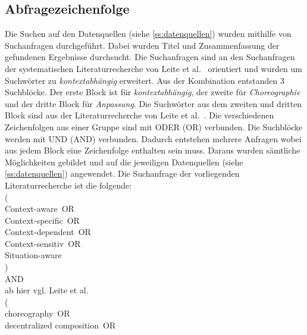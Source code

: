 \documentclass[conference,compsoc,ngerman]{IEEEtran}
\begin{document}
\subsection{Abfragezeichenfolge}
\label{section:suchanfrage}
Die Suchen auf den Datenquellen (siehe \cref{ss:datenquellen}) wurden mithilfe von Suchanfragen durchgeführt. Dabei wurden Titel und Zusammenfassung der gefundenen Ergebnisse durchsucht.
Die Suchanfragen sind an den Suchanfragen der systematischen Literaturrecherche von Leite et al.~\cite{leite2013systematic} orientiert und wurden um Suchwörter zu \textit{kontextabhängig} erweitert.
Aus der Kombination entstanden 3 Suchblöcke. Der erste Block ist für \textit{kontextabhängig}, der zweite für \textit{Choreographie} und der dritte Block für \textit{Anpassung}. Die Suchwörter aus dem zweiten und dritten Block sind aus der Literaturrecherche von Leite et al.~\cite{leite2013systematic}. Die verschiedenen Zeichenfolgen aus einer Gruppe sind mit ODER (OR) verbunden. Die Suchblöcke werden mit UND (AND) verbunden. Dadurch entstehen mehrere Anfragen wobei aus jedem Block eine Zeichenfolge enthalten sein muss. Daraus wurden sämtliche Möglichkeiten gebildet und auf die jeweiligen Datenquellen (siehe \cref{ss:datenquellen}) angewendet. 
Die Suchanfrage der vorliegenden Literaturrecherche ist die folgende:\\
(\\
	\glqq Context-aware\grqq~OR\\
	\glqq Context-specific\grqq~OR\\
	\glqq Context-dependent\grqq~OR\\
	\glqq Context-sensitiv\grqq~OR\\
	\glqq Situation-aware\grqq \\
)\\
AND\\
ab hier vgl. Leite et al.~\cite{leite2013systematic} \\
 (\\
\glqq choreography\grqq~OR\\
\glqq decentralized composition\grqq~OR\\
\end{document}
